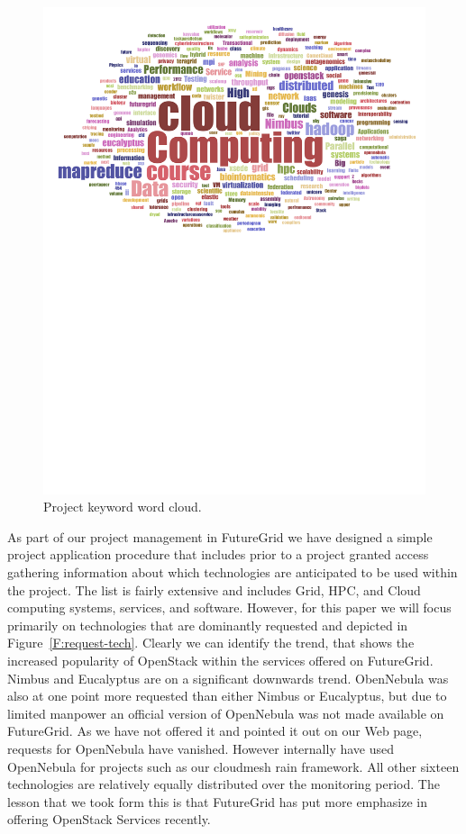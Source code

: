 \documentclass{article}
\begin{document}
\begin{figure}[p]
\begin{minipage}[t]{1.0\textwidth}
  \centering
    \includegraphics[width=1.0\textwidth]{images/fg-keyword-wordcloud.pdf}
  \caption{Project keyword word cloud.}\label{F:keycloud}
\end{minipage}
\end{figure}


As part of our project management in FutureGrid we have designed a simple project application procedure that includes prior to a project granted access gathering information about which technologies are anticipated to be used within the project. The list is fairly extensive and includes Grid, HPC, and Cloud computing systems, services, and software. However, for this paper we will focus primarily on technologies that are dominantly requested and depicted in Figure~\ref{F:request-tech}. Clearly we can identify the trend, that shows the increased popularity of OpenStack within the services offered on FutureGrid. Nimbus and Eucalyptus are on a significant downwards trend. ObenNebula was also at one point more requested than either Nimbus or Eucalyptus, but due to limited manpower an official version of OpenNebula was not made available on FutureGrid. As we have not offered it and pointed it out on our Web page, requests for OpenNebula have vanished.  However internally have used OpenNebula for projects such as our cloudmesh rain framework. All other sixteen technologies are relatively equally distributed over the monitoring period. The lesson that we took form this is that FutureGrid has put more emphasize in offering OpenStack Services recently.
\end{document}
